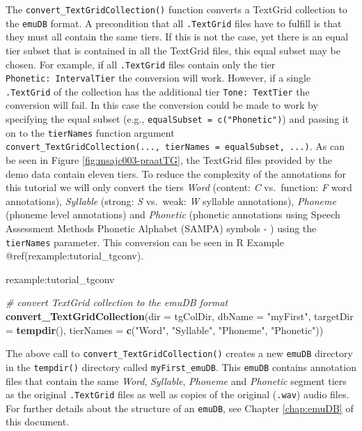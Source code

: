 \documentclass[]{book}
\newenvironment{Shaded}{\begin{snugshade}}{\end{snugshade}}
\newcommand{\CommentTok}[1]{\textcolor[rgb]{0.56,0.35,0.01}{\textit{#1}}}
\newcommand{\DataTypeTok}[1]{\textcolor[rgb]{0.13,0.29,0.53}{#1}}
\newcommand{\KeywordTok}[1]{\textcolor[rgb]{0.13,0.29,0.53}{\textbf{#1}}}
\newcommand{\NormalTok}[1]{#1}
\newcommand{\StringTok}[1]{\textcolor[rgb]{0.31,0.60,0.02}{#1}}
\theoremstyle{definition}
\theoremstyle{definition}
\theoremstyle{definition}
\theoremstyle{remark}
\begin{document}
The \texttt{convert\_TextGridCollection()} function converts a TextGrid
collection to the \texttt{emuDB} format. A precondition that all
\texttt{.TextGrid} files have to fulfill is that they must all contain
the same tiers. If this is not the case, yet there is an equal tier
subset that is contained in all the TextGrid files, this equal subset
may be chosen. For example, if all \texttt{.TextGrid} files contain only
the tier \texttt{Phonetic:\ IntervalTier} the conversion will work.
However, if a single \texttt{.TextGrid} of the collection has the
additional tier \texttt{Tone:\ TextTier} the conversion will fail. In
this case the conversion could be made to work by specifying the equal
subset (e.g., \texttt{equalSubset\ =\ c("Phonetic")}) and passing it on
to the \texttt{tierNames} function argument
\texttt{convert\_TextGridCollection(...,\ tierNames\ =\ equalSubset,\ ...)}.
As can be seen in Figure \ref{fig:msajc003-praatTG}, the TextGrid files
provided by the demo data contain eleven tiers. To reduce the complexity
of the annotations for this tutorial we will only convert the tiers
\emph{Word} (content: \emph{C} vs.~function: \emph{F} word annotations),
\emph{Syllable} (strong: \emph{S} vs.~weak: \emph{W} syllable
annotations), \emph{Phoneme} (phoneme level annotations) and
\emph{Phonetic} (phonetic annotations using Speech Assessment Methods
Phonetic Alphabet (SAMPA) symbols - \citet{wells:1997aa}) using the
\texttt{tierNames} parameter. This conversion can be seen in R Example
@ref(rexample:tutorial\_tgconv).

rexample:tutorial\_tgconv

\begin{Shaded}
\begin{Highlighting}[]
\CommentTok{# convert TextGrid collection to the emuDB format}
\KeywordTok{convert_TextGridCollection}\NormalTok{(}\DataTypeTok{dir =}\NormalTok{ tgColDir,}
                           \DataTypeTok{dbName =} \StringTok{"myFirst"}\NormalTok{,}
                           \DataTypeTok{targetDir =} \KeywordTok{tempdir}\NormalTok{(),}
                           \DataTypeTok{tierNames =} \KeywordTok{c}\NormalTok{(}\StringTok{"Word"}\NormalTok{, }\StringTok{"Syllable"}\NormalTok{,}
                                         \StringTok{"Phoneme"}\NormalTok{, }\StringTok{"Phonetic"}\NormalTok{))}
\end{Highlighting}
\end{Shaded}

The above call to \texttt{convert\_TextGridCollection()} creates a new
\texttt{emuDB} directory in the \texttt{tempdir()} directory called
\texttt{myFirst\_emuDB}. This \texttt{emuDB} contains annotation files
that contain the same \emph{Word}, \emph{Syllable}, \emph{Phoneme} and
\emph{Phonetic} segment tiers as the original \texttt{.TextGrid} files
as well as copies of the original (\texttt{.wav}) audio files. For
further details about the structure of an \texttt{emuDB}, see Chapter
\ref{chap:emuDB} of this document.
\end{document}
